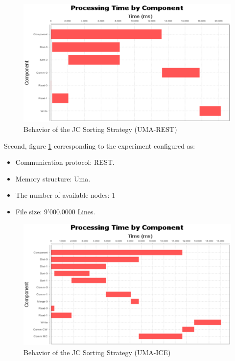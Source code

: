 \begin{figure}[H]
	\centering
	\includegraphics[trim=0.5cm 17cm -5cm 1cm, scale=0.9]{fig/JCUmaRest190Behavior.eps}
	\caption{Behavior of the JC Sorting Strategy (UMA-REST)}
	\label{fig:originalStrategyBehaviorRest}
\end{figure}

Second, figure \ref{fig:originalStrategyBehaviorRest} corresponding to the experiment configured as: 
\begin{itemize}
	\item Communication protocol: REST.
	\item  Memory structure: Uma.
	\item The number of available nodes: 1
 	\item File size: 9'000.0000 Lines.
\end{itemize}

\begin{figure}[H]
	\centering
	\includegraphics[trim=0.5cm 0cm -5cm 0cm, scale=0.74]{fig/JCUmaIce226Behavior.eps}
	\caption{Behavior of the JC Sorting Strategy (UMA-ICE)}
	\label{fig:originalStrategyBehaviorIce}
\end{figure}

